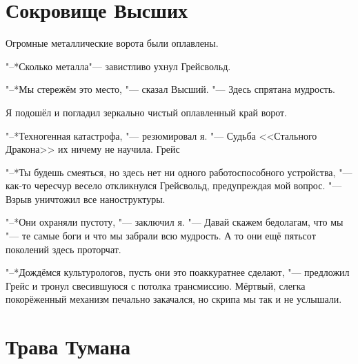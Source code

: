 \documentclass[a4paper,10pt,fleqn]{book}
\newcommand{\ldotst}{\so{...}\xspace}
\begin{document}
\section{Сокровище Высших}

Огромные металлические ворота были оплавлены.

"--*Сколько металла\ldotst "--- завистливо ухнул Грейсвольд.

"--*Мы стережём это место, "--- сказал Высший.
"--- Здесь спрятана мудрость.

Я подошёл и погладил зеркально чистый оплавленный край ворот.

"--*Техногенная катастрофа, "--- резюмировал я.
"--- Судьба <<Стального Дракона>> их ничему не научила.
Грейс\ldotst

"--*Ты будешь смеяться, но здесь нет ни одного работоспособного устройства, "--- как-то чересчур весело откликнулся Грейсвольд, предупреждая мой вопрос.
"--- Взрыв уничтожил все наноструктуры.

"--*Они охраняли пустоту, "--- заключил я.
"--- Давай скажем бедолагам, что мы "--- те самые боги и что мы забрали всю мудрость.
А то они ещё пятьсот поколений здесь проторчат.

"--*Дождёмся культурологов, пусть они это поаккуратнее сделают, "--- предложил Грейс и тронул свесившуюся с потолка трансмиссию.
Мёртвый, слегка покорёженный механизм печально закачался, но скрипа мы так и не услышали.

\section{Трава Тумана}
\end{document}
